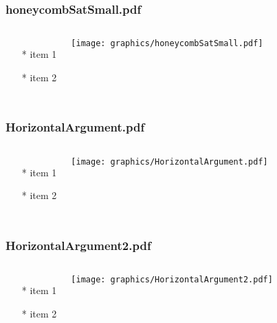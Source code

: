 \documentclass{beamer}
\begin{document}
\begin{frame} \frametitle{honeycombSatSmall.pdf}
    \begin{columns}[c]
        \begin{itemize}
            \item[*] item 1
            \item[*] item 2
        \end{itemize}
        \begin{minipage}{\linewidth}
            \begin{center}
            \texttt{[image: graphics/honeycombSatSmall.pdf]}
            \label{gfx:honeycombSatSmall.pdf}
            \end{center}
        \end{minipage}
    \end{columns}
\end{frame}
\begin{frame} \frametitle{HorizontalArgument.pdf}
    \begin{columns}[c]
        \begin{itemize}
            \item[*] item 1
            \item[*] item 2
        \end{itemize}
        \begin{minipage}{\linewidth}
            \begin{center}
            \texttt{[image: graphics/HorizontalArgument.pdf]}
            \label{gfx:HorizontalArgument.pdf}
            \end{center}
        \end{minipage}
    \end{columns}
\end{frame}
\begin{frame} \frametitle{HorizontalArgument2.pdf}
    \begin{columns}[c]
        \begin{itemize}
            \item[*] item 1
            \item[*] item 2
        \end{itemize}
        \begin{minipage}{\linewidth}
            \begin{center}
            \texttt{[image: graphics/HorizontalArgument2.pdf]}
            \label{gfx:HorizontalArgument2.pdf}
            \end{center}
        \end{minipage}
    \end{columns}
\end{frame}
\end{document}
